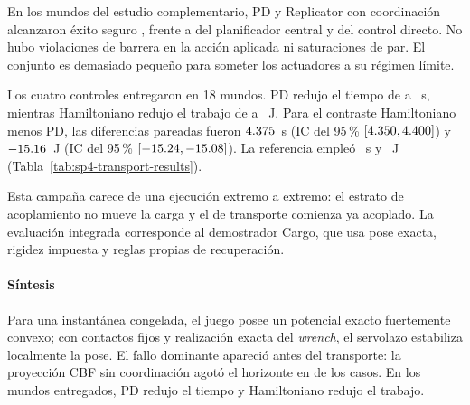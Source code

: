 En los \SPFourVFourWorlds{} mundos del estudio complementario, PD y Replicator con coordinación alcanzaron éxito seguro \SPFourVFourGameSafe{}, frente a \SPFourVFourCentralSafe{} del planificador central y \SPFourVFourDirectSafe{} del control directo. No hubo violaciones de barrera en la acción aplicada ni saturaciones de par. El conjunto es demasiado pequeño para someter los actuadores a su régimen límite.

Los cuatro controles entregaron en 18 mundos. PD redujo el tiempo de \SPFourHamiltonianTime{} a \SPFourPoseTime{}~s, mientras Hamiltoniano redujo el trabajo de \SPFourPoseWork{} a \SPFourHamiltonianWork{}~J. Para el contraste Hamiltoniano menos PD, las diferencias pareadas fueron $4.375{}$~s (IC del 95\,\% $[4.350{},4.400{}]$) y $-15.16{}$~J (IC del 95\,\% $[-15.24{},-15.08{}]$). La referencia empleó \SPFourCentralTime{}~s y \SPFourCentralWork{}~J (Tabla~\ref{tab:sp4-transport-results}).

\begin{table}[!htbp]
  \centering
  \caption{Transporte planar en el estrato abierto nominal de E4-C.}
  \label{tab:sp4-transport-results}
  \resizebox{\textwidth}{!}{}
  \viuownsource
\end{table}

Esta campaña carece de una ejecución extremo a extremo: el estrato de acoplamiento no mueve la carga y el de transporte comienza ya acoplado. La evaluación integrada corresponde al demostrador Cargo, que usa pose exacta, rigidez impuesta y reglas propias de recuperación.

\paragraph{Síntesis}

Para una instantánea congelada, el juego posee un potencial exacto fuertemente convexo; con contactos fijos y realización exacta del \emph{wrench}, el servolazo estabiliza localmente la pose. El fallo dominante apareció antes del transporte: la proyección CBF sin coordinación agotó el horizonte en \SPFourCBFTimeout{} de los casos. En los mundos entregados, PD redujo el tiempo y Hamiltoniano redujo el trabajo.
